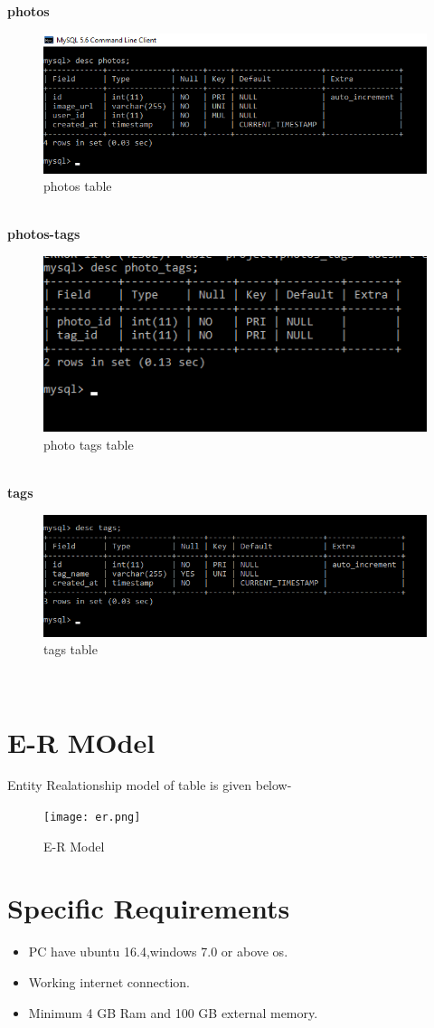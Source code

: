 \textbf{photos}
\begin{figure}[h!]
	\centering
	\includegraphics[width=0.75\linewidth]{photos.png}
	\caption{photos table}
\end{figure}\\
\textbf{photos-tags}
\begin{figure}[h!]
	\centering
	\includegraphics[width=0.75\linewidth]{photo_tag.png}
	\caption{photo tags table}
\end{figure}
\\
\textbf{tags}
\begin{figure}[h!]
	\centering
	\includegraphics[width=0.75\linewidth]{tags.png}
	\caption{tags table}
\end{figure}
\\

\section{E-R MOdel}
Entity Realationship model of table is given below-
\begin{figure}[h!]
	\centering
	\texttt{[image: er.png]}
	\caption{E-R Model}
	\label{fig:E-R Model}
\end{figure}
\section{Specific Requirements}
\begin{itemize}
	\item PC have ubuntu 16.4,windows 7.0 or above os.
	\item Working internet connection.
	\item Minimum 4 GB Ram and 100 GB external memory.
\end{itemize}
